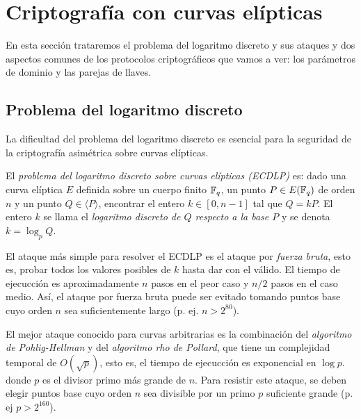 \section{Criptografía con curvas elípticas}
\label{sec:Criptografía con curvas elípticas}




En esta sección trataremos el problema del logaritmo discreto y sus ataques y dos aspectos comunes de los protocolos criptográficos que vamos a ver: los parámetros de dominio y las parejas de llaves.

\subsection{Problema del logaritmo discreto}
\label{sub:Problema del logaritmo discreto}

La dificultad del problema del logaritmo discreto es esencial para la seguridad de la criptografía asimétrica sobre curvas elípticas.

\begin{definicion}
    El \emph{problema del logaritmo discreto sobre curvas elípticas (ECDLP)} es: dado una curva elíptica $E$ definida sobre un cuerpo finito $\mathbb{F}_q$, un punto $P \in E(\mathbb{F}_q)$ de orden $n$ y un punto $Q \in \langle P \rangle$, encontrar el entero $k \in [0, n - 1]$ tal que $Q = k P$. El entero $k$ se llama el \emph{logaritmo discreto de $Q$ respecto a la base $P$} y se denota $k = \log_p Q$.
\end{definicion}

El ataque más simple para resolver el ECDLP es el ataque por \emph{fuerza bruta}, esto es, probar todos los valores posibles de $k$ hasta dar con el válido. El tiempo de ejecucción es aproximadamente $n$ pasos en el peor caso y $n / 2$ pasos en el caso medio. Así, el ataque por fuerza bruta puede ser evitado tomando puntos base cuyo orden $n$ sea suficientemente largo (p. ej. $n > 2^{80}$).

El mejor ataque conocido para curvas arbitrarias es la combinación del \emph{algoritmo de Pohlig-Hellman} y del \emph{algoritmo rho de Pollard}, que tiene un complejidad temporal de $O(\sqrt{p})$, esto es, el tiempo de ejecucción es exponencial en $\log{p}$. donde $p$ es el divisor primo más grande de $n$. Para resistir este ataque, se deben elegir puntos base cuyo orden $n$ sea divisible por un primo $p$ suficiente grande (p. ej $p > 2^{160}$).

